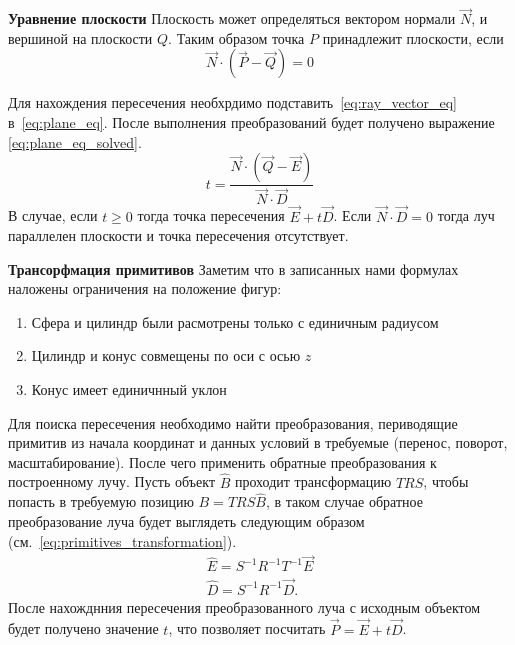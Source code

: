 \textbf{Уравнение плоскости}
Плоскость может определяться вектором нормали $\vec{N}$, и вершиной на плоскости $Q$. Таким образом точка $P$ принадлежит плоскости, если 
\begin{equation}
	\vec{N} \cdot (\vec{P} - \vec{Q}) = 0
	\label{eq:plane_eq}
\end{equation}

Для нахождения пересечения необхрдимо подставить~\ref{eq:ray_vector_eq} в~\ref{eq:plane_eq}. После выполнения преобразований будет получено
выражение \ref{eq:plane_eq_solved}.
\begin{equation}
	t=\frac{\vec{N} \cdot (\vec{Q} - \vec{E})}{\vec{N} \cdot \vec{D}}
	\label{eq:plane_eq_solved}
\end{equation}
В случае, если $t \ge 0$ тогда точка пересечения $\vec{E} + t\vec{D}$. Если $\vec{N} \cdot \vec{D} = 0$ тогда луч параллелен плоскости и
точка пересечения отсутствует.\cite{primitives_raytracing_equations}


\textbf{Трансорфмация примитивов}
Заметим что в записанных нами формулах наложены ограничения на положение фигур:
\begin{enumerate}
	\item Сфера и цилиндр были расмотрены только с единичным радиусом
	\item Цилиндр и конус совмещены по оси с осью $z$
	\item Конус имеет единичнный уклон
\end{enumerate}
Для поиска пересечения необходимо найти преобразования, периводящие примитив из начала координат и данных условий в требуемые (перенос, поворот, масштабирование).
После чего применить обратные преобразования к построенному лучу.
Пусть объект $\hat{B}$ проходит трансформацию $TRS$, чтобы попасть в требуемую позицию $B = TRS\hat{B}$, в таком случае обратное преобразование луча будет выглядеть
следующим образом (см.~\ref{eq:primitives_transformation}).
\begin{equation}
	\label{eq:primitives_transformation}
	\begin{aligned}
		\hat{E} = S^{-1}R^{-1}T^{-1}\vec{E}\\
		\hat{D} = S^{-1}R^{-1}\vec{D}.
	\end{aligned}
\end{equation}
После нахожднния пересечения преобразованного луча с исходным объектом будет получено значение $t$, что позволяет посчитать $\vec{P} = \vec{E} +t\vec{D}$.

